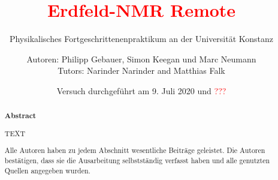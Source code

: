 \title{\textcolor{red}{Erdfeld-NMR Remote}}
\subtitle{Physikalisches Fortgeschrittenenpraktikum an der Universität Konstanz}
\author{Autoren: Philipp Gebauer, Simon Keegan und Marc Neumann \\ \large{Tutors: Narinder Narinder and Matthias Falk}}
\date{Versuch durchgeführt am 9. Juli 2020 und \textcolor{red}{???}}
\maketitle
\begin{abstract}
    \begin{center}
        \Large{\textsf{\textbf{Abstract}}}
    \end{center}
    \vspace{0.75 cm}
    \begin{singlespace}
    \noindent TEXT
    \vspace{0.75 cm}
     
    \noindent Alle Autoren haben zu jedem Abschnitt wesentliche Beiträge geleistet. Die Autoren bestätigen, dass sie die Ausarbeitung selbstständig verfasst haben und alle genutzten Quellen angegeben wurden.

\end{singlespace}
\end{abstract}

\thispagestyle{empty}
\newpage